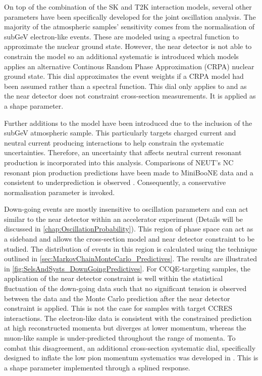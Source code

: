 
On top of the combination of the SK and T2K interaction models, several other parameters have been specifically developed for the joint oscillation analysis. The majority of the atmospheric samples' \dcp sensitivity comes from the normalisation of subGeV electron-like events. These are modeled using a spectral function to approximate the nuclear ground state. However, the near detector is not able to constrain the model so an additional systematic is introduced which models applies an alternative Continous Random Phase Approximation (CRPA) nuclear ground state. This dial approximates the event weights if a CRPA model had been assumed rather than a spectral function. This dial only applies to  and  as the near detector does not constraint  cross-section measurements. It is applied as a shape parameter.

Further additions to the model have been introduced due to the inclusion of the subGeV  atmospheric sample. This particularly targets charged current and neutral current  producing interactions to help constrain the systematic uncertainties. Therefore, an uncertainty that affects neutral current resonant  production is incorporated into this analysis. Comparisons of NEUT's NC resonant pion production predictions have been made to MiniBooNE \cite{MB_NC1pi0} data and a consistent  to  underprediction is observed \cite{t2k_tn_422}. Consequently, a conservative  normalisation parameter is invoked. 

Down-going events are mostly insensitive to oscillation parameters and can act similar to the near detector within an accelerator experiment (Details will be discussed in \autoref{chap:OscillationProbability}). This region of phase space can act as a sideband and allows the cross-section model and near detector constraint to be studied. The distribution of events in this region is calculated using the technique outlined in \autoref{sec:MarkovChainMonteCarlo_Predictives}. The results are illustrated in \autoref{fig:SelsAndSysts_DownGoingPredictives}. For CCQE-targeting samples, the application of the near detector constraint is well within the statistical fluctuation of the down-going data such that no significant tension is observed between the data and the Monte Carlo prediction after the near detector constraint is applied. This is not the case for samples with target CCRES interactions. The electron-like data is consistent with the constrained prediction at high reconstructed momenta but diverges at lower momentum, whereas the muon-like sample is under-predicted throughout the range of momenta. To combat this disagreement, an additional cross-section systematic dial, specifically designed to inflate the low pion momentum systematics was developed in \cite{t2k_tn_422}. This is a shape parameter implemented through a splined response. 

